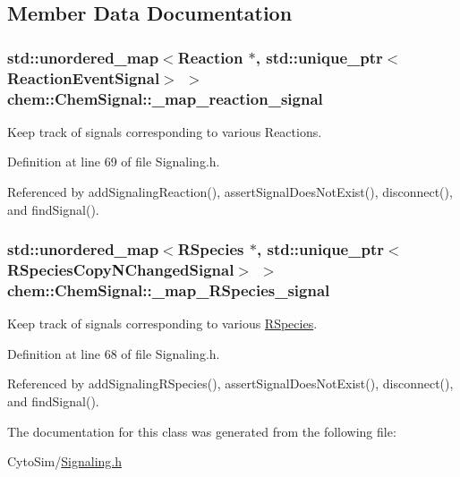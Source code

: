\subsection{Member Data Documentation}
\hypertarget{classchem_1_1ChemSignal_adf624fe946c197ee1a325fb31d6c748d}{
\subsubsection[{\-\_\-map\-\_\-reaction\-\_\-signal}]{\setlength{\rightskip}{0pt plus 5cm}std\-::unordered\-\_\-map$<${\bf Reaction} $\ast$, std\-::unique\-\_\-ptr$<${\bf Reaction\-Event\-Signal}$>$ $>$ {\bf chem\-::\-Chem\-Signal\-::\-\_\-map\-\_\-reaction\-\_\-signal}}}\label{classchem_1_1ChemSignal_adf624fe946c197ee1a325fb31d6c748d}


Keep track of signals corresponding to various Reactions. 



Definition at line 69 of file Signaling.\-h.



Referenced by add\-Signaling\-Reaction(), assert\-Signal\-Does\-Not\-Exist(), disconnect(), and find\-Signal().

\hypertarget{classchem_1_1ChemSignal_a7721fb9395d65c7de08108163a3d4cdb}{
\subsubsection[{\-\_\-map\-\_\-\-R\-Species\-\_\-signal}]{\setlength{\rightskip}{0pt plus 5cm}std\-::unordered\-\_\-map$<${\bf R\-Species} $\ast$, std\-::unique\-\_\-ptr$<${\bf R\-Species\-Copy\-N\-Changed\-Signal}$>$ $>$ {\bf chem\-::\-Chem\-Signal\-::\-\_\-map\-\_\-\-R\-Species\-\_\-signal}}}\label{classchem_1_1ChemSignal_a7721fb9395d65c7de08108163a3d4cdb}


Keep track of signals corresponding to various \hyperlink{classchem_1_1RSpecies}{R\-Species}. 



Definition at line 68 of file Signaling.\-h.



Referenced by add\-Signaling\-R\-Species(), assert\-Signal\-Does\-Not\-Exist(), disconnect(), and find\-Signal().



The documentation for this class was generated from the following file\-:\begin{DoxyCompactItemize}
\item 
Cyto\-Sim/\hyperlink{Signaling_8h}{Signaling.\-h}\end{DoxyCompactItemize}
